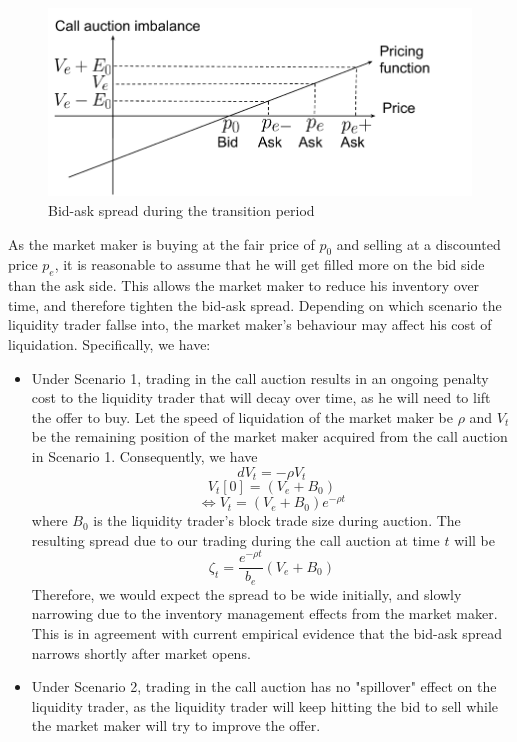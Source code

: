 \begin{figure}[h]
  \includegraphics[width=\textwidth]{images/MMPricingTransitionPeriod}
  \caption{Bid-ask spread during the transition period}
  \label{fig:mm_pricing_transition_period}
\end{figure}

As the market maker is buying at the fair price of $p_0$ and selling at a discounted price $p_e$, it is reasonable to assume that he will get filled more on the bid side than the ask side. This allows the market maker to reduce his inventory over time, and therefore tighten the bid-ask spread. Depending on which scenario the liquidity trader fallse into, the market maker's behaviour may affect his cost of liquidation. Specifically, we have:

\begin{itemize}
  \item Under Scenario 1, trading in the call auction results in an ongoing penalty cost to the liquidity trader that will decay over time, as he will need to lift the offer to buy. Let the speed of liquidation of the market maker be $\rho$ and $V_t$ be the remaining position of the market maker acquired from the call auction in Scenario 1. Consequently, we have
        \[
          dV_t = -\rho V_t
        \]
        \[
          V_t[0]=(V_e + B_0)
        \]
        \begin{equation}\label{eqn:recovery_term_eqb}
          \Leftrightarrow V_t = (V_e + B_0) e^{-\rho t}
        \end{equation}
        where $B_0$ is the liquidity trader's block trade size during auction. The resulting spread due to our trading during the call auction at time $t$ will be
        \[
          \zeta_t = \frac{e^{-\rho t}}{b_e}  (V_e + B_0)
        \]
        Therefore, we would expect the spread to be wide initially, and slowly narrowing due to the inventory management effects from the market maker. This is in agreement with current empirical evidence that the bid-ask spread narrows shortly after market opens.
  \item Under Scenario 2, trading in the call auction has no "spillover" effect on the liquidity trader, as the liquidity trader will keep hitting the bid to sell while the market maker will try to improve the offer.
\end{itemize}

